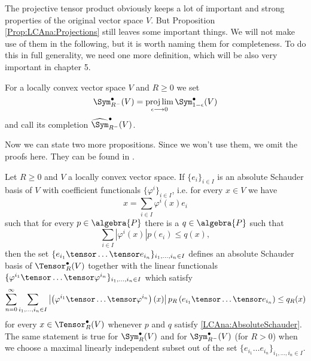 The projective tensor product obviously keeps a lot of important and 
strong properties of the original vector space $V$. But Proposition 
\ref{Prop:LCAna:Projections} still leaves some important things. 
We will not make use of them in the following, but it is worth naming 
them for completeness. To do this in full generality, we 
need one more definition, which will be also very important in chapter 5.
\begin{definition}\label{ProjectiveLimit}
	For a locally convex vector space $V$ and $R \geq 0$ we set
	\begin{equation*}
		\Sym_{R^-}^{\bullet}(V)
		=
		\projlim\limits_{\epsilon \longrightarrow 0}
		\Sym_{1 - \epsilon}^{\bullet}(V)
	\end{equation*}
	and call its completion $\widehat{\Sym}_{R^-}^{\bullet}(V)$.
\end{definition}
Now we can state two more propositions. Since we won't use them, we omit the 
proofs here. They can be found in \cite{Waldmann:nuclear:2014}.
\begin{proposition}
	\label{Prop:LCAna:Bases}
	Let $R \geq 0$ and $V$ a locally convex vector space.
	If $\{e_i\}_{i \in I}$ is an absolute Schauder basis of $V$ with 
	coefficient functionals $\{\varphi^i\}_{i \in I}$, i.e. for every 
	$x \in V$ we have
	\begin{equation*}
		x
		=
		\sum\limits_{i \in I}
		\varphi^i(x) e_i
	\end{equation*}
	such that for every $p \in \algebra{P}$ there is a 
	$q \in \algebra{P}$ such that
	\begin{equation}
		\label{LCAna:AbsoluteSchauder}
		\sum\limits_{i \in I}
		|\varphi^i(x)|
		p(e_i)
		\leq
		q(x),
	\end{equation}
	then the set 
	$\{e_{i_1} \tensor \ldots \tensor e_{i_n}\}_{i_1, \ldots, i_n \in I}$ 
	defines an absolute Schauder basis of $\Tensor_R^{\bullet}(V)$ 
	together with the linear functionals $\{\varphi^{i_1} \tensor \ldots 
	\tensor 	\varphi^{i_n}\}_{i_1, \ldots, i_n \in I}$ which satisfy
	\begin{equation*}
		\sum\limits_{n=0}^{\infty}
		\sum\limits_{i_1, \ldots, i_n \in I}
		\left| 
			\left(
				\varphi^{i_1} \tensor \ldots \tensor \varphi^{i_n}
			\right)
			(x)
		\right|
		p_R \left(
			e_{i_1} \tensor \ldots \tensor e_{i_n}
		\right)
		\leq
		q_R (x)
	\end{equation*}
	for every $x \in \Tensor_R^{\bullet}(V)$ whenever $p$ and $q$ satisfy 
	\eqref{LCAna:AbsoluteSchauder}. The same statement is true for 
	$\Sym_R^{\bullet}(V)$ and for $\Sym_{R^-}^{\bullet}(V)$ (for $R > 0$) when 
	we choose a maximal linearly independent subset out of the set $\{e_{i_1} 
	\ldots e_{i_n}\}_{i_1, \ldots, i_n \in I}$.
\end{proposition}
